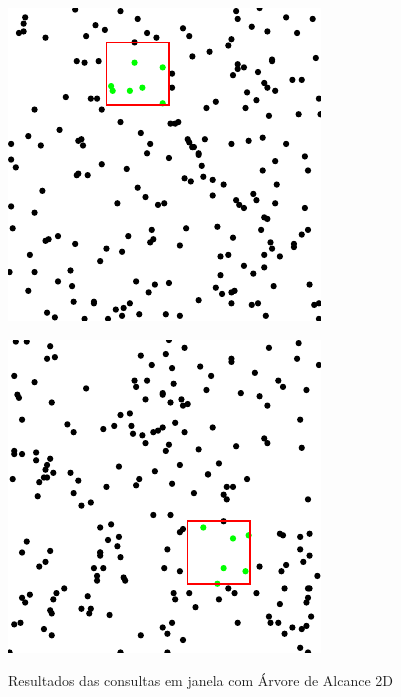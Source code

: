 \begin{figure}[h]
\centering
\begin{minipage}{.5\textwidth}
  \centering
  \includegraphics[width=.8\linewidth]{images/rt_t1.pdf}

  \label{fig:test1}
\end{minipage}%
\begin{minipage}{.5\textwidth}
  \centering
  
  \includegraphics[width=.8\linewidth]{images/rt_t2.pdf}
  \label{fig:test2}
 
\end{minipage}
 \caption{Resultados das consultas em janela com Árvore de Alcance 2D}
\end{figure}

